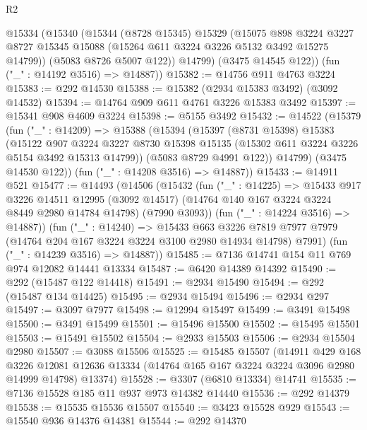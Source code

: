 \begin{lexlean}{R2}
\begin{coremodule}
      @15334
        (@15340
          (@15344
            (@8728 @15345)
            @15329
            (@15075
              @898
              @3224
              @3227
              @8727
              @15345
              @15088
              (@15264 @611 @3224 @3226 @5132 @3492 @15275 @14799))
            (@5083 @8726 @5007 @122))
          @14799)
        (@3475 @14545 @122))
      (fun ("_" : @14192 @3516) => @14887))
@15382 := @14756 @911 @4763 @3224
@15383 := @292 @14530
@15388 := @15382 (@2934 @15383 @3492) (@3092 @14532)
@15394 := @14764 @909 @611 @4761 @3226 @15383 @3492
@15397 := @15341 @908 @4609 @3224
@15398 := @5155 @3492
@15432 := @14522
    (@15379
      (fun ("_" : @14209) =>
      @15388
        (@15394
          (@15397
            (@8731 @15398)
            @15383
            (@15122
              @907
              @3224
              @3227
              @8730
              @15398
              @15135
              (@15302 @611 @3224 @3226 @5154 @3492 @15313 @14799))
            (@5083 @8729 @4991 @122))
          @14799)
        (@3475 @14530 @122))
      (fun ("_" : @14208 @3516) => @14887))
@15433 := @14911 @521
@15477 := @14493
    (@14506
      (@15432
        (fun ("_" : @14225) =>
        @15433
          @917
          @3226
          @14511
          @12995
          (@3092 @14517)
          (@14764 @140 @167 @3224 @3224 @8449 @2980 @14784 @14798)
          (@7990 @3093))
        (fun ("_" : @14224 @3516) => @14887))
      (fun ("_" : @14240) =>
      @15433
        @663
        @3226
        @7819
        @7977
        @7979
        (@14764 @204 @167 @3224 @3224 @3100 @2980 @14934 @14798)
        @7991)
      (fun ("_" : @14239 @3516) => @14887))
@15485 := @7136 @14741 @154 @11 @769 @974 @12082 @14441 @13334
@15487 := @6420 @14389 @14392
@15490 := @292 (@15487 @122 @14418)
@15491 := @2934 @15490
@15494 := @292 (@15487 @134 @14425)
@15495 := @2934 @15494
@15496 := @2934 @297
@15497 := @3097 @7977
@15498 := @12994 @15497
@15499 := @3491 @15498
@15500 := @3491 @15499
@15501 := @15496 @15500
@15502 := @15495 @15501
@15503 := @15491 @15502
@15504 := @2933 @15503
@15506 := @2934 @15504 @2980
@15507 := @3088 @15506
@15525 := @15485
    @15507
    (@14911
      @429
      @168
      @3226
      @12081
      @12636
      @13334
      (@14764 @165 @167 @3224 @3224 @3096 @2980 @14999 @14798)
      @13374)
@15528 := @3307 (@6810 @13334) @14741
@15535 := @7136 @15528 @185 @11 @937 @973 @14382 @14440
@15536 := @292 @14379
@15538 := @15535 @15536 @15507
@15540 := @3423 @15528 @929
@15543 := @15540 @936 @14376 @14381
@15544 := @292 @14370

\end{coremodule}
\end{lexlean}
